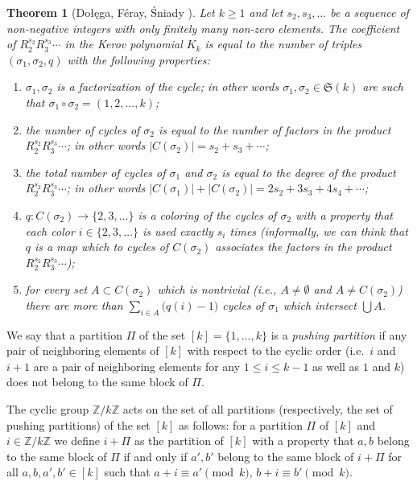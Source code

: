 \documentclass[12pt]{amsart}
\theoremstyle{plain}
\newtheorem{theorem}[lemma]{Theorem}
\theoremstyle{remark}
\newcommand{\Sym}{\mathfrak{S}}
\newcommand{\Z}{\mathbb{Z}}
\begin{document}
\begin{theorem}[Dołęga, F\'eray, \'Sniady \cite{DolegaF'eray'Sniady2008}]
\label{theo:dfs}
Let $k\geq 1$ and let $s_2,s_3,\dots$ be a sequence of non-negative integers
with only finitely
many non-zero elements. The coefficient of $R_2^{s_2} R_3^{s_3} \cdots $ in
the Kerov polynomial $K_{k}$ is equal to the number of triples
$(\sigma_1,\sigma_2,q)$ with the following properties:
\begin{enumerate}[label=(\alph*)]
 \item \label{enum:first-condition}
$\sigma_1,\sigma_2$ is a factorization of the
cycle; in other words $\sigma_1,\sigma_2\in \Sym(k)$ are such that $\sigma_1
\circ \sigma_2=(1,2,\dots,k)$;
 \item \label{enum:ilosc2} the number of cycles of $\sigma_2$ is equal to the
number of\/ factors in
the product $R_2^{s_2} R_3^{s_3} \cdots $; in other words
$|C(\sigma_2)|=s_2+s_3+\cdots$;
 \item \label{enum:boys-and-girls} the total number of cycles of $\sigma_1$ and
$\sigma_2$ is equal to the degree of the product
$R_2^{s_2} R_3^{s_3} \cdots $; in other words
$|C(\sigma_1)|+|C(\sigma_2)|=2 s_2+3 s_3+4 s_4+\cdots$;
 \item \label{enum:kolorowanie} $q:C(\sigma_2)\rightarrow \{2,3,\dots\}$ is a
coloring of the cycles of
$\sigma_2$ with a property that each color $i\in\{2,3,\dots\}$ is used exactly
$s_i$ times (informally, we can think that $q$ is a map which to cycles of
$C(\sigma_2)$ associates the factors in the product $R_2^{s_2} R_3^{s_3}
\cdots$);
 \item \label{enum:marriage} for every set $A\subset C(\sigma_2)$ which is
nontrivial (i.e., $A\neq\emptyset$ and $A\neq C(\sigma_2)$) there are more than
$\sum_{i\in A} \big( q(i)-1 \big) $ cycles of\/ $\sigma_1$ which intersect
$\bigcup A$.
\end{enumerate}
\end{theorem}


We say that a partition $\Pi$ of the set $[k]=\{1,\dots,k\}$ is a \emph{pushing partition} if any pair of neighboring
elements of $[k]$ with respect to the cyclic order (i.e.~$i$ and $i+1$ are a pair of neighboring elements for
any $1\leq i\leq k-1$ as well as $1$ and $k$) does not belong to the same block of $\Pi$.

The cyclic group $\Z/ k \Z$ acts on the set of all partitions (respectively, the set of pushing partitions) of the set
$[k]$ as follows: for a partition $\Pi$ of $[k]$ and $i\in \Z/ k \Z$  we define $i + \Pi$ as the partition of $[k]$
with a property that $a,b$ belong to the same block of $\Pi$ if and only if $a',b'$ belong to the same block of $i +
\Pi$ for all $a,b,a',b'\in [k]$ such that $a+i \equiv a' \pmod k$, $b+i \equiv b' \pmod k$.
\end{document}
